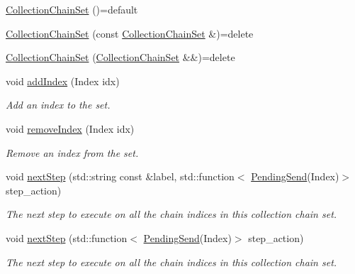 \begin{DoxyCompactItemize}
\item 
\hyperlink{classvt_1_1messaging_1_1_collection_chain_set_aeb43ad4a2e46ea059817b639b72ddb3b}{Collection\+Chain\+Set} ()=default
\item 
\hyperlink{classvt_1_1messaging_1_1_collection_chain_set_a71328cb5c03210ffdb0bd5dd5f3b6797}{Collection\+Chain\+Set} (const \hyperlink{classvt_1_1messaging_1_1_collection_chain_set}{Collection\+Chain\+Set} \&)=delete
\item 
\hyperlink{classvt_1_1messaging_1_1_collection_chain_set_a21be566436c86fa59a02a1bd073a9e48}{Collection\+Chain\+Set} (\hyperlink{classvt_1_1messaging_1_1_collection_chain_set}{Collection\+Chain\+Set} \&\&)=delete
\item 
void \hyperlink{classvt_1_1messaging_1_1_collection_chain_set_aefc11c9b011b4916c3b80dfc8f776239}{add\+Index} (Index idx)
\begin{DoxyCompactList}\small\item\em Add an index to the set. \end{DoxyCompactList}\item 
void \hyperlink{classvt_1_1messaging_1_1_collection_chain_set_a299e52c482aba47bcdabe796d236c043}{remove\+Index} (Index idx)
\begin{DoxyCompactList}\small\item\em Remove an index from the set. \end{DoxyCompactList}\item 
void \hyperlink{classvt_1_1messaging_1_1_collection_chain_set_aa6ab934f32d8623872cfcd7ed9e147b2}{next\+Step} (std\+::string const \&label, std\+::function$<$ \hyperlink{structvt_1_1messaging_1_1_pending_send}{Pending\+Send}(Index)$>$ step\+\_\+action)
\begin{DoxyCompactList}\small\item\em The next step to execute on all the chain indices in this collection chain set. \end{DoxyCompactList}\item 
void \hyperlink{classvt_1_1messaging_1_1_collection_chain_set_aa4e8a0a24fa7cde6e7f729f4dd002e64}{next\+Step} (std\+::function$<$ \hyperlink{structvt_1_1messaging_1_1_pending_send}{Pending\+Send}(Index)$>$ step\+\_\+action)
\begin{DoxyCompactList}\small\item\em The next step to execute on all the chain indices in this collection chain set. \end{DoxyCompactList}\item 

\end{DoxyCompactItemize}
